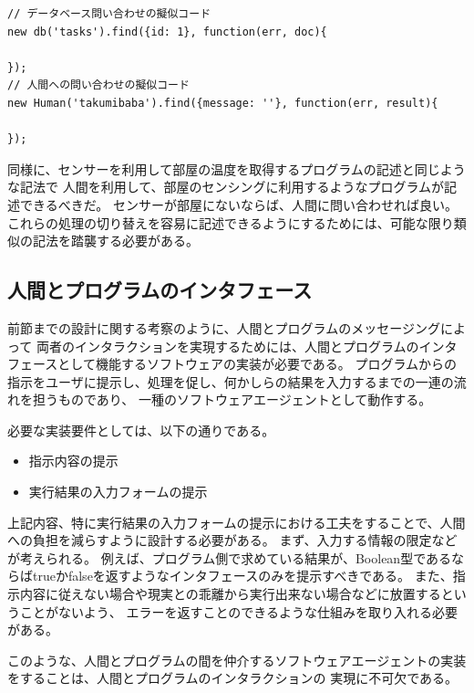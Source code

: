 \begin{lstlisting}[caption=人間への指示を計算機への指示と類似させる, label=code:design-integrated-program-style]
// データベース問い合わせの擬似コード
new db('tasks').find({id: 1}, function(err, doc){

});
// 人間への問い合わせの擬似コード
new Human('takumibaba').find({message: ''}, function(err, result){

});
\end{lstlisting}

同様に、センサーを利用して部屋の温度を取得するプログラムの記述と同じような記法で
人間を利用して、部屋のセンシングに利用するようなプログラムが記述できるべきだ。
センサーが部屋にないならば、人間に問い合わせれば良い。
これらの処理の切り替えを容易に記述できるようにするためには、可能な限り類似の記法を踏襲する必要がある。

\subsection{人間とプログラムのインタフェース}\label{ux4ebaux9593ux3068ux30d7ux30edux30b0ux30e9ux30e0ux306eux30a4ux30f3ux30bfux30d5ux30a7ux30fcux30b9}

前節までの設計に関する考察のように、人間とプログラムのメッセージングによって
両者のインタラクションを実現するためには、人間とプログラムのインタフェースとして機能するソフトウェアの実装が必要である。
プログラムからの指示をユーザに提示し、処理を促し、何かしらの結果を入力するまでの一連の流れを担うものであり、
一種のソフトウェアエージェントとして動作する。

必要な実装要件としては、以下の通りである。

\begin{itemize}
\itemsep1pt\parskip0pt
\item
  指示内容の提示
\item
  実行結果の入力フォームの提示
\end{itemize}

上記内容、特に実行結果の入力フォームの提示における工夫をすることで、人間への負担を減らすように設計する必要がある。
まず、入力する情報の限定などが考えられる。
例えば、プログラム側で求めている結果が、Boolean型であるならばtrueかfalseを返すようなインタフェースのみを提示すべきである。
また、指示内容に従えない場合や現実との乖離から実行出来ない場合などに放置するということがないよう、
エラーを返すことのできるような仕組みを取り入れる必要がある。

このような、人間とプログラムの間を仲介するソフトウェアエージェントの実装をすることは、人間とプログラムのインタラクションの
実現に不可欠である。

